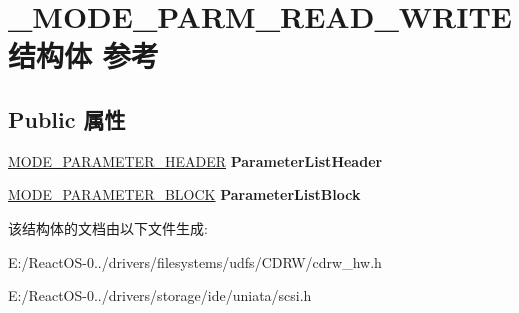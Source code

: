\hypertarget{struct___m_o_d_e___p_a_r_m___r_e_a_d___w_r_i_t_e}{}\section{\+\_\+\+M\+O\+D\+E\+\_\+\+P\+A\+R\+M\+\_\+\+R\+E\+A\+D\+\_\+\+W\+R\+I\+T\+E结构体 参考}
\label{struct___m_o_d_e___p_a_r_m___r_e_a_d___w_r_i_t_e}
\subsection*{Public 属性}
\begin{DoxyCompactItemize}
\item 
\mbox{\label{struct___m_o_d_e___p_a_r_m___r_e_a_d___w_r_i_t_e_a696d534bd50ce8ed0ae4b7f565c7bdc5}} 
\hyperlink{struct___m_o_d_e___p_a_r_a_m_e_t_e_r___h_e_a_d_e_r}{M\+O\+D\+E\+\_\+\+P\+A\+R\+A\+M\+E\+T\+E\+R\+\_\+\+H\+E\+A\+D\+ER} {\bfseries Parameter\+List\+Header}
\item 
\mbox{\label{struct___m_o_d_e___p_a_r_m___r_e_a_d___w_r_i_t_e_a7768994311ce6f29fef2b11c350d5ae9}} 
\hyperlink{struct___m_o_d_e___p_a_r_a_m_e_t_e_r___b_l_o_c_k}{M\+O\+D\+E\+\_\+\+P\+A\+R\+A\+M\+E\+T\+E\+R\+\_\+\+B\+L\+O\+CK} {\bfseries Parameter\+List\+Block}
\end{DoxyCompactItemize}


该结构体的文档由以下文件生成\+:\begin{DoxyCompactItemize}
\item 
E\+:/\+React\+O\+S-\/0../drivers/filesystems/udfs/\+C\+D\+R\+W/cdrw\+\_\+hw.\+h\item 
E\+:/\+React\+O\+S-\/0../drivers/storage/ide/uniata/scsi.\+h\end{DoxyCompactItemize}
